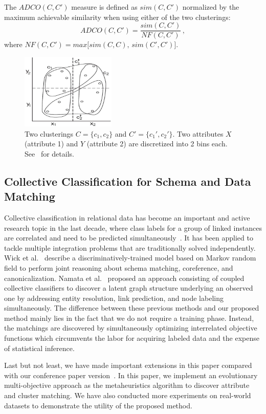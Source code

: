 The $ADCO(C,C')$ measure is defined as $sim(C,C')$ normalized by the maximum achievable similarity when using either of the two clusterings:
\begin{equation}
ADCO(C, C') = \frac{sim(C, C')}{NF(C, C')} \, , \label{eq:adco}
\end{equation}
where $NF(C, C') = max \big[sim(C, C), \,sim(C', C')\big]$.

\begin{figure}[tb]
\begin{center}
\includegraphics[width=0.4\textwidth]{fig/density_profile.eps}
\end{center}
\caption[An example of cluster density profiles]{\label{fig:density_profile} Two clusterings $C=\{c_1, c_2\}$ and $C'=\{c_1', c_2'\}$. Two attributes $X$ (attribute 1) and $Y$ (attribute 2) are discretized into 2 bins each. See~\cite{Bae2010} for details.}
\end{figure} 

\subsection{Collective Classification for Schema and Data Matching}
Collective classification in relational data has become an important and active research topic in the last decade, where class labels for a group of linked instances are correlated and need to be predicted simultaneously~\cite{kong:multi-label}. It has been applied to tackle multiple integration problems that are traditionally solved independently. Wick et al.~\cite{Wick2008} describe a discriminatively-trained model based on Markov random field to perform joint reasoning about schema matching, coreference, and canonicalization. Namata et al.~\cite{Namata2011} proposed an approach consisting of coupled collective classifiers to discover a latent graph structure underlying an observed one by addressing entity resolution, link prediction, and node labeling simultaneously. The difference between these previous methods and our proposed method mainly lies in the fact that we do not require a training phase. Instead, the matchings are discovered by simultaneously optimizing interrelated objective functions which circumvents the labor for acquiring labeled data and the expense of statistical inference.

Last but not least, we have made important extensions in this paper compared with our conference paper version~\cite{LiuDou11}. In this paper, we implement an evolutionary multi-objective approach as the metaheuristics algorithm to discover attribute and cluster matching. We have also conducted more experiments on real-world datasets to demonstrate the utility of the proposed method.


